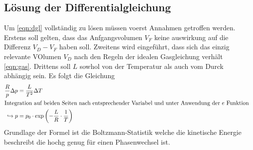 \subsection{Lösung der Differentialgleichung}
Um \eqref{eqn:dgl} vollständig zu lösen müssen voerst Annahmen getroffen werden. 
Erstens soll gelten, dass das Anfgangsvolumen $V_F$ keine auswirkung auf die Differenz $V_D - V_F$ haben soll. Zweitens wird eingeführt, dass 
sich das einzig relevante VOlumen $V_D$ nach den Regeln der idealen Gasgleichung verhält \eqref{eqn:gas}. Drittens soll $L$ sowhol von der Temperatur
als auch vom Durck abhängig sein.
Es folgt die Gleichung
\begin{align}
\label{eqn:wichtig}
    \frac{R}{p} \Delta p &= \frac{L}{T^2} \Delta T \\
    \intertext{Integration auf beiden Seiten nach entsprechender Variabel und unter Anwendung der $e$ Funktion}
    \hookrightarrow p &= p_0 \cdot \text{exp} \left(-\frac{L}{R} \cdot \frac{1}{T}\right)
\end{align}
Grundlage der Formel ist die Boltzmann-Statistik welche die kinetische Energie beschreibt die hochg genug für einen Phasenwechsel ist. 

